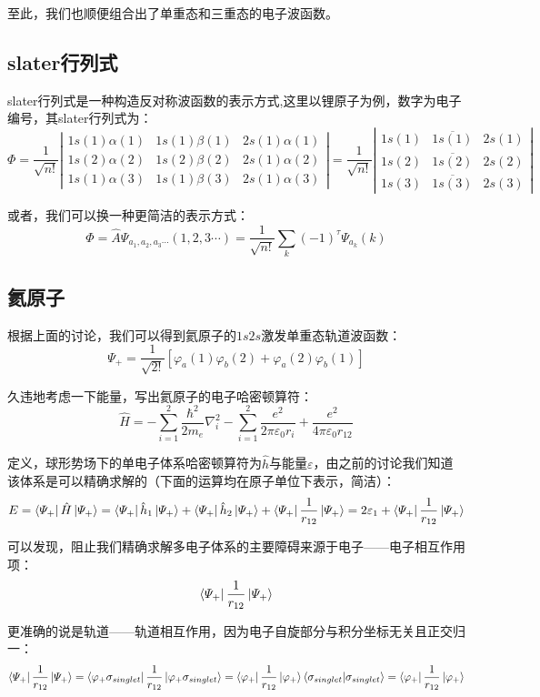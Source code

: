 至此，我们也顺便组合出了单重态和三重态的电子波函数。

\subsection{slater行列式}
slater行列式是一种构造反对称波函数的表示方式,这里以锂原子为例，数字为电子编号，其slater行列式为：
\[\varPhi=\frac{1}{\sqrt{n!}}
\left |
\begin{array}{lll}
1s(1)\alpha(1) & 1s(1)\beta(1) & 2s(1)\alpha(1) \\
1s(2)\alpha(2) & 1s(2)\beta(2) & 2s(1)\alpha(2) \\
1s(1)\alpha(3) & 1s(1)\beta(3) & 2s(1)\alpha(3)
\end{array}
\right |
=\frac{1}{\sqrt{n!}}
\left |
\begin{array}{lll}
1s(1) & \overline{1s(1)} & 2s(1) \\
1s(2) & \overline{1s(2)} & 2s(2) \\
1s(3) & \overline{1s(3)} & 2s(3)
\end{array}
\right |
\]

或者，我们可以换一种更简洁的表示方式：
\[\varPhi=\hat{A}\varPsi_{a_1,a_2,a_3 \cdots}(1,2,3\cdots)=\frac{1}{\sqrt{n!}}\sum_k(-1)^{\tau}\varPsi_{a_k}(k)\]

\subsection{氦原子}
根据上面的讨论，我们可以得到氦原子的$1s2s$激发单重态轨道波函数：
\[\varPsi_{+}=\frac{1}{\sqrt{2!}}[\varphi_a(1)\varphi_b(2)+\varphi_a(2)\varphi_b(1)]\]

久违地考虑一下能量，写出氦原子的电子哈密顿算符：
\[\hat{H}=-\sum_{i=1}^2\frac{\hbar^2}{2m_e}\nabla^2_i-\sum_{i=1}^2\frac{e^2}{2 \pi \varepsilon_0 r_{i}}+\frac{e^2}{4 \pi \varepsilon_0 r_{12}}\]

定义，球形势场下的单电子体系哈密顿算符为$\hat{h}$与能量$\varepsilon$，由之前的讨论我们知道该体系是可以精确求解的（下面的运算均在原子单位下表示，简洁）：
\[E=\bra{\varPsi_{+}}\hat{H}\ket{\varPsi_{+}}=\bra{\varPsi_{+}}\hat{h}_1\ket{\varPsi_{+}}+\bra{\varPsi_{+}}\hat{h}_2\ket{\varPsi_{+}}+\bra{\varPsi_{+}}\frac{1}{r_{12}}\ket{\varPsi_{+}}=2\varepsilon_{1}+\bra{\varPsi_{+}}\frac{1}{r_{12}}\ket{\varPsi_{+}}\]

可以发现，阻止我们精确求解多电子体系的主要障碍来源于电子——电子相互作用项：
\[\bra{\varPsi_{+}}\frac{1}{r_{12}}\ket{\varPsi_{+}}\]

更准确的说是轨道——轨道相互作用，因为电子自旋部分与积分坐标无关且正交归一：
\[\bra{\varPsi_{+}}\frac{1}{r_{12}}\ket{\varPsi_{+}}=\bra{\varphi_{+}\sigma_{singlet}}\frac{1}{r_{12}}\ket{\varphi_{+}\sigma_{singlet}}=\bra{\varphi_{+}}\frac{1}{r_{12}}\ket{\varphi_{+}}\bra{\sigma_{singlet}}\ket{\sigma_{singlet}}=\bra{\varphi_{+}}\frac{1}{r_{12}}\ket{\varphi_{+}}\]


